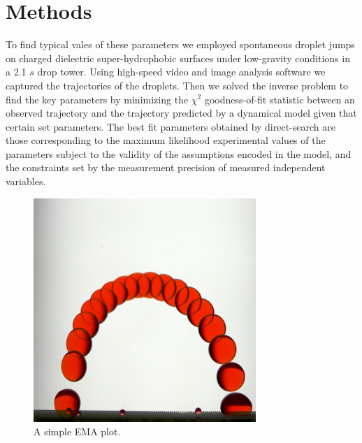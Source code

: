 \documentclass[a4paper, 12pt]{article}
\begin{document}
\section{Methods}
To find typical vales of these parameters we employed spontaneous droplet jumps on charged dielectric super-hydrophobic surfaces under low-gravity conditions in a 2.1 $s$ drop tower. Using high-speed video and image analysis software we captured the trajectories of the droplets. Then we solved the inverse problem to find the key parameters by minimizing the $\chi^2$ goodness-of-fit statistic between an observed trajectory and the trajectory predicted by a dynamical model given that certain set parameters. The best fit parameters obtained by direct-search are those corresponding to the maximum likelihood experimental values of the parameters subject to the validity of the assumptions encoded in the model, and the constraints set by the measurement precision of measured independent variables.

\begin{figure}[htb]
\centering
\includegraphics[width=0.75\textwidth]{bounce}
\caption{A simple EMA plot.\label{fig:bounce}}
\end{figure}
\end{document}
